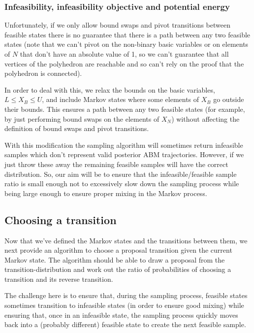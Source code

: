 \documentclass{article}
\begin{document}
\subsubsection{Infeasibility, infeasibility objective and potential energy}

Unfortunately, if we only allow bound swaps and pivot transitions between feasible states there is no guarantee that there is a path between any two feasible states (note that we can't pivot on the non-binary basic variables or on elements of $N$ that don't have an absolute value of 1, so we can't guarantee that all vertices of the polyhedron are reachable and so can't rely on the proof that the polyhedron is connected).

In order to deal with this, we relax the bounds on the basic variables, $L \le X_B \le U$, and include Markov states where some elements of $X_B$ go outside their bounds. This ensures a path between any two feasible states (for example, by just performing bound swaps on the elements of $X_N$) without affecting the definition of bound swaps and pivot transitions.

With this modification the sampling algorithm will sometimes return infeasible samples which don't represent valid posterior ABM trajectories. However, if we just throw these away the remaining feasible samples will have the correct distribution. So, our aim will be to ensure that the infeasible/feasible sample ratio is small enough not to excessively slow down the sampling process while being large enough to ensure proper mixing in the Markov process.

\subsection{Choosing a transition}

Now that we've defined the Markov states and the transitions between them, we next provide an algorithm to choose a proposal transition given the current Markov state. The algorithm should be able to draw a proposal from the transition-distribution and work out the ratio of probabilities of choosing a transition and its reverse transition.

The challenge here is to ensure that, during the sampling process, feasible states sometimes transition to infeasible states (in order to ensure good mixing) while ensuring that, once in an infeasible state, the sampling process quickly moves back into a (probably different) feasible state to create the next feasible sample.
\end{document}
